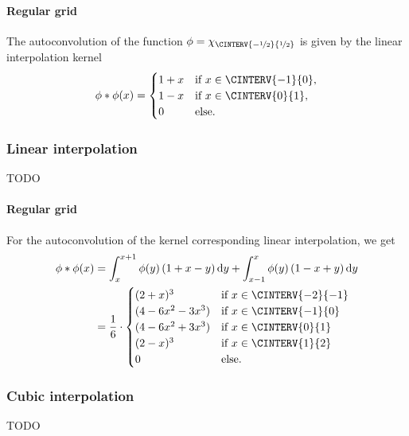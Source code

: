 \documentclass[a4paper]{paper}
\newcommand*{\D}{{\ensuremath{\mathrm{d}}}}
\begin{document}
\paragraph{Regular grid}

The autoconvolution of the function $\phi = \chi_{\CINTERV{-\nicefrac{1}{2}}{\nicefrac{1}{2}}}$ is given by the linear 
interpolation kernel
%
\begin{equation*}
 \phi \ast \phi(x) = 
 \begin{cases}
  1 + x & \text{if } x \in \CINTERV{-1}{0}, \\
  1 - x & \text{if } x \in \CINTERV{0}{1}, \\
  0 & \text{else.}
 \end{cases}
\end{equation*}


\subsubsection{Linear interpolation}
\label{subsubsec:specif:conv:linear}

TODO

\paragraph{Regular grid}

For the autoconvolution of the kernel corresponding linear interpolation, we get
%
\begin{align*}
 \phi \ast \phi(x) 
 &= \int_x^{x+1} \phi(y)\, (1+x-y)\, \D y + \int_{x-1}^x \phi(y)\, (1-x+y)\, \D y \\
 &= \frac{1}{6}\cdot 
 \begin{cases}
  (2+x)^3 & \text{if } x \in \CINTERV{-2}{-1} \\
  (4 - 6x^2 - 3x^3) & \text{if } x \in \CINTERV{-1}{0} \\
  (4 - 6x^2 + 3x^3) & \text{if } x \in \CINTERV{0}{1} \\
  (2-x)^3 & \text{if } x \in \CINTERV{1}{2} \\
  0 & \text{else}.
 \end{cases}
\end{align*}


\subsubsection{Cubic interpolation}
\label{subsubsec:specif:conv:cubic}

TODO
\end{document}
